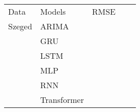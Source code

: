 \begin{table}[]
\begin{tabular}{|l|l|l|ll}
\cline{1-3}
Data                        & Models      & RMSE   &  &  \\ \cline{1-3}
\multicolumn{1}{|c|}{Szeged}& ARIMA       & 	   &  &  \\ \cline{1-3}
                            & GRU         & 	   &  &  \\ \cline{1-3}
                            & LSTM        & 	   &  &  \\ \cline{1-3}
                            & MLP         &        &  &  \\ \cline{1-3}
                            & RNN         & 	   &  &  \\ \cline{1-3}
                            & Transformer &        &  &  \\ \cline{1-3}
\end{tabular}
\end{table}
